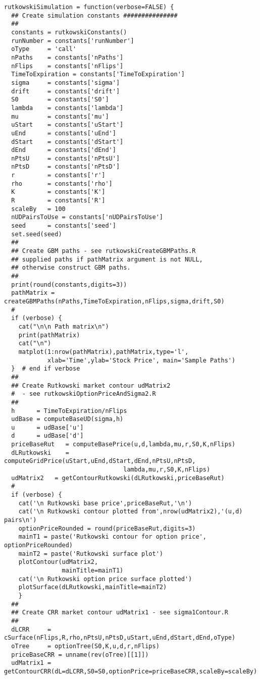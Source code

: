 \documentclass[10pt]{article}
\begin{document}
\begin{verbatim}
rutkowskiSimulation = function(verbose=FALSE) {
  ## Create simulation constants ###############
  ##
  constants = rutkowskiConstants()
  runNumber = constants['runNumber']
  oType     = 'call'
  nPaths    = constants['nPaths']
  nFlips    = constants['nFlips']
  TimeToExpiration = constants['TimeToExpiration']
  sigma     = constants['sigma']
  drift     = constants['drift']
  S0        = constants['S0']
  lambda    = constants['lambda']
  mu        = constants['mu']
  uStart    = constants['uStart']
  uEnd      = constants['uEnd']
  dStart    = constants['dStart']
  dEnd      = constants['dEnd']
  nPtsU     = constants['nPtsU']
  nPtsD     = constants['nPtsD']
  r         = constants['r']
  rho       = constants['rho']
  K         = constants['K']
  R         = constants['R']
  scaleBy   = 100
  nUDPairsToUse = constants['nUDPairsToUse']
  seed      = constants['seed']
  set.seed(seed)
  ##
  ## Create GBM paths - see rutkowskiCreateGBMPaths.R
  ## supplied paths if pathMatrix argument is not NULL,
  ## otherwise construct GBM paths.
  ##
  print(round(constants,digits=3))
  pathMatrix = createGBMPaths(nPaths,TimeToExpiration,nFlips,sigma,drift,S0)
  #
  if (verbose) {
    cat("\n\n Path matrix\n")
    print(pathMatrix)
    cat("\n")
    matplot(1:nrow(pathMatrix),pathMatrix,type='l',
            xlab='Time',ylab='Stock Price', main='Sample Paths')
  }  # end if verbose
  ##
  ## Create Rutkowski market contour udMatrix2
  #  - see rutkowskiOptionPriceAndSigma2.R
  ##
  h      = TimeToExpiration/nFlips
  udBase = computeBaseUD(sigma,h)
  u      = udBase['u']
  d      = udBase['d']
  priceBaseRut   = computeBasePrice(u,d,lambda,mu,r,S0,K,nFlips)
  dLRutkowski    = computeGridPrice(uStart,uEnd,dStart,dEnd,nPtsU,nPtsD,
                                 lambda,mu,r,S0,K,nFlips)
  udMatrix2   = getContourRutkowski(dLRutkowski,priceBaseRut)
  #
  if (verbose) {
    cat('\n Rutkowski base price',priceBaseRut,'\n')
    cat('\n Rutkowski contour plotted from',nrow(udMatrix2),'(u,d) pairs\n')
    optionPriceRounded = round(priceBaseRut,digits=3)
    mainT1 = paste('Rutkowski contour for option price', optionPriceRounded)
    mainT2 = paste('Rutkowski surface plot')
    plotContour(udMatrix2,
                mainTitle=mainT1)
    cat('\n Rutkowski option price surface plotted')
    plotSurface(dLRutkowski,mainTitle=mainT2)
    }
  ##
  ## Create CRR market contour udMatrix1 - see sigma1Contour.R
  ##
  dLCRR     = cSurface(nFlips,R,rho,nPtsU,nPtsD,uStart,uEnd,dStart,dEnd,oType)
  oTree     = optionTree(S0,K,u,d,r,nFlips)
  priceBaseCRR = unname(rev(oTree)[[1]])
  udMatrix1 = getContourCRR(dL=dLCRR,S0=S0,optionPrice=priceBaseCRR,scaleBy=scaleBy)

\end{verbatim}
\end{document}
